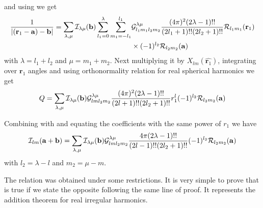 and using  we get
\begin{equation}
\begin{split}
\frac{1}{|({\bf r}_1-{\bf
    a})-{\bf b}|}=\sum_{\lambda,\mu}\mathcal{I}_{\lambda \mu}({\bf b})\sum_{l_1=0}^{\lambda}\sum_{m_1=-l_1}^{l_1}&\mathcal{G}_{l_1m_1l_2m_2}^{\lambda \mu}\frac{(4\pi)^2(2\lambda-1)!!}{(2l_1+1)!!(2l_2+1)!!}\mathcal{R}_{l_1m_1}({\bf r}_1)\\&\times(-1)^{l_2}\mathcal{R}_{l_2m_2}({\bf a})
\end{split}
\end{equation}
with $\lambda=l_1+l_2$ and $\mu=m_1+m_2$. Next multiplying it by $X_{lm}(\hat{\bm{r}_1})$, integrating over
$\bm{r}_1$ angles and using orthonormality relation for real spherical
harmonics we get 
\begin{equation}
\label{q3}
Q=\sum_{\lambda,\mu}\mathcal{I}_{\lambda \mu}({\bf b})\mathcal{G}_{lml_2m_2}^{\lambda \mu}\frac{(4\pi)^2(2\lambda-1)!!}{(2l+1)!!(2l_2+1)!!}r_1^l(-1)^{l_2}\mathcal{R}_{l_2m_2}({\bf a})
\end{equation}
\par{Combining  with  and equating the coefficients with the same
power of $r_1$ we have}
\begin{equation}
\label{iadd}
\mathcal{I}_{lm}({\bf a}+{\bf b})=\sum_{\lambda,\mu}\mathcal{I}_{\lambda \mu}({\bf b})\mathcal{G}_{lml_2m_2}^{\lambda \mu}\frac{4\pi(2\lambda-1)!!}{(2l-1)!!(2l_2+1)!!}(-1)^{l_2}\mathcal{R}_{l_2m_2}({\bf a})
\end{equation}
with $l_2=\lambda-l$ and $m_2=\mu-m$. 
\par{The relation  was obtained
under some restrictions. It is very simple to prove that is true if we state
the opposite following the same line of proof. It represents the addition
theorem for real irregular harmonics.}